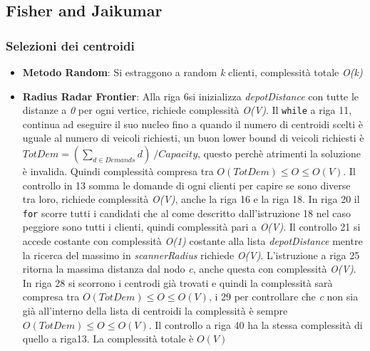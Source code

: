 \documentclass[]{article}
\begin{document}
\subsection{Fisher and Jaikumar}

\subsubsection{Selezioni dei centroidi}

\begin{itemize}
\item \textbf{Metodo Random}: Si estraggono a random \emph{k} clienti, complessità totale \emph{O(k)}

\item  \textbf{Radius Radar Frontier}: 
Alla riga 6si inizializza \textit{depotDistance} con tutte le distanze a \emph{0} per ogni vertice, richiede complessità \emph{O(V)}. Il \texttt{while} a riga 11, continua ad eseguire il suo nucleo fino a quando il numero di centroidi scelti è uguale al numero di veicoli richiesti, un buon lower bound di veicoli richiesti è \emph{$TotDem = (\sum_{d \in Demands} d)  \ / Capacity$}, questo perchè atrimenti la soluzione è invalida. Quindi complessità compresa tra \emph{$O(TotDem) \leq O \leq O(V)$}. Il controllo in 13 somma le domande di ogni clienti per capire se sono diverse tra loro, richiede complessità \emph{O(V)}, anche la riga 16 e la riga 18. In riga 20 il \texttt{for} scorre tutti i candidati che al come descritto dall'istruzione 18 nel caso peggiore sono tutti i clienti, quindi complessità pari a  \emph{O(V)}. Il controllo 21 si accede costante con complessità \emph{O(1)} costante alla lista \textit{depotDistance} mentre la ricerca del massimo in  \textit{scannerRadius} richiede \emph{O(V)}. L'istruzione a riga 25 ritorna la massima distanza dal nodo \emph{c}, anche questa con complessità \emph{O(V)}. In riga 28 si scorrono i centrodi già trovati e quindi la complessità sarà compresa tra \emph{$O(TotDem) \leq O \leq O(V)$}, i 29 per controllare che \emph{c} non sia già all'interno della lista di centroidi la complessità è sempre \emph{$O(TotDem) \leq O \leq O(V)$}. Il controllo a riga 40 ha la stessa complessità di quello a riga13. La complessità totale è \emph{$O(V)$}
\end{itemize}
\end{document}
